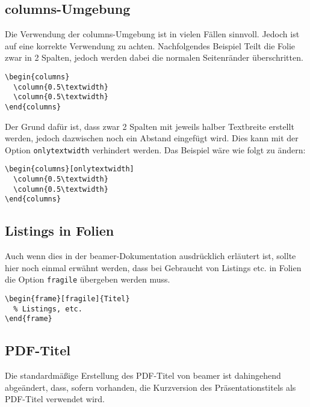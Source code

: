 \subsection{columns-Umgebung}

Die Verwendung der columns-Umgebung ist in vielen Fällen sinnvoll.
Jedoch ist auf eine korrekte Verwendung zu achten.
Nachfolgendes Beispiel Teilt die Folie zwar in 2 Spalten,
jedoch werden dabei die normalen Seitenränder überschritten.

\begin{lstlisting}
\begin{columns}
  \column{0.5\textwidth}
  \column{0.5\textwidth}
\end{columns}
\end{lstlisting}

Der Grund dafür ist, dass zwar 2 Spalten mit jeweils halber Textbreite erstellt
werden, jedoch dazwischen noch ein Abstand eingefügt wird. Dies kann mit der
Option \lstinline{onlytextwidth} verhindert werden.
Das Beispiel wäre wie folgt zu ändern:

\begin{lstlisting}[morekeywords={onlytextwidth},keywordstyle=\color{tuOrange}]
\begin{columns}[onlytextwidth]
  \column{0.5\textwidth}
  \column{0.5\textwidth}
\end{columns}
\end{lstlisting}


\subsection{Listings in Folien}

Auch wenn dies in der beamer-Dokumentation ausdrücklich erläutert ist,
sollte hier noch einmal erwähnt werden, dass bei Gebraucht von Listings etc.
in Folien die Option \lstinline{fragile} übergeben werden muss.

\begin{lstlisting}
\begin{frame}[fragile]{Titel}
  % Listings, etc.
\end{frame}
\end{lstlisting}



\subsection{PDF-Titel}

Die standardmäßige Erstellung des PDF-Titel von beamer ist dahingehend
abgeändert, dass, sofern vorhanden, die Kurzversion des Präsentationstitels
als PDF-Titel verwendet wird.

